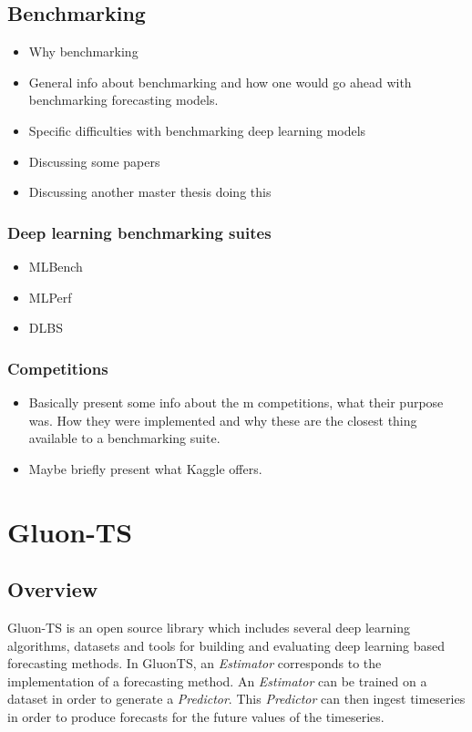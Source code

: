\subsection{Benchmarking}
\begin{itemize}
\item Why benchmarking
\item General info about benchmarking and how one would go ahead with benchmarking forecasting models.
\end{itemize}
\begin{itemize}
\item Specific difficulties with benchmarking deep learning models
\item Discussing some papers
\item Discussing another master thesis doing this
\end{itemize}

\subsubsection{Deep learning benchmarking suites}
\begin{itemize}
\item MLBench
\item MLPerf
\item DLBS
\end{itemize}

\subsubsection{Competitions}
\begin{itemize}
\item Basically present some info about the m competitions, what their purpose was. How they were implemented and why these are the closest thing available to a benchmarking suite. 
\end{itemize}
\begin{itemize}
\item Maybe briefly present what Kaggle offers.
\end{itemize}

\section{Gluon-TS}
\subsection{Overview}
\label{subsec:gluonts_overview}
Gluon-TS is an open source library which includes several deep learning algorithms, datasets and tools for building and evaluating deep learning based forecasting methods. In GluonTS, an \textit{Estimator} corresponds to the implementation of a forecasting method. An \textit{Estimator} can be trained on a dataset in order to generate a \textit{Predictor}. This \textit{Predictor} can then ingest timeseries in order to produce forecasts for the future values of the timeseries. 

